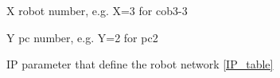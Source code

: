 %
%
\markboth{\uppercase{\nomname}}{\uppercase{\nomname}}

{}
\printnomenclature%


\begin{thenomenclature}


  \item [{X}]\begingroup robot number, e.g. X=3 for cob3-3
  \item [{Y}]\begingroup pc number, e.g. Y=2 for pc2
  \item[{IP}]\begingroup parameter that define the robot network \ref{IP_table} 

\end{thenomenclature}
